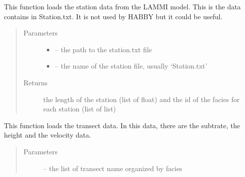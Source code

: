 \documentclass[letterpaper,10pt,english]{sphinxmanual}
\begin{document}
\begin{fulllineitems}
\label{\detokenize{index:src.lammi.load_station}}
This function loads the station data from the LAMMI model. This is the data contains in Station.txt. It is not used
by HABBY but it could be useful.
\begin{quote}\begin{description}
\item[{Parameters}] \leavevmode\begin{itemize}
\item {} 
 -- the path to the station.txt file

\item {} 
 -- the name of the station file, usually `Station.txt'

\end{itemize}

\item[{Returns}] \leavevmode
the length of the station (list of float) and the id of the facies for each station (list of list)

\end{description}\end{quote}

\end{fulllineitems}


\begin{fulllineitems}
\label{\detokenize{index:src.lammi.load_transect_data}}
This function loads the transect data. In this data, there are the subtrate, the height and the velocity data.
\begin{quote}\begin{description}
\item[{Parameters}] \leavevmode
{} -- the list of transect name organized by facies

\end{description}\end{quote}

\end{fulllineitems}

\end{document}
